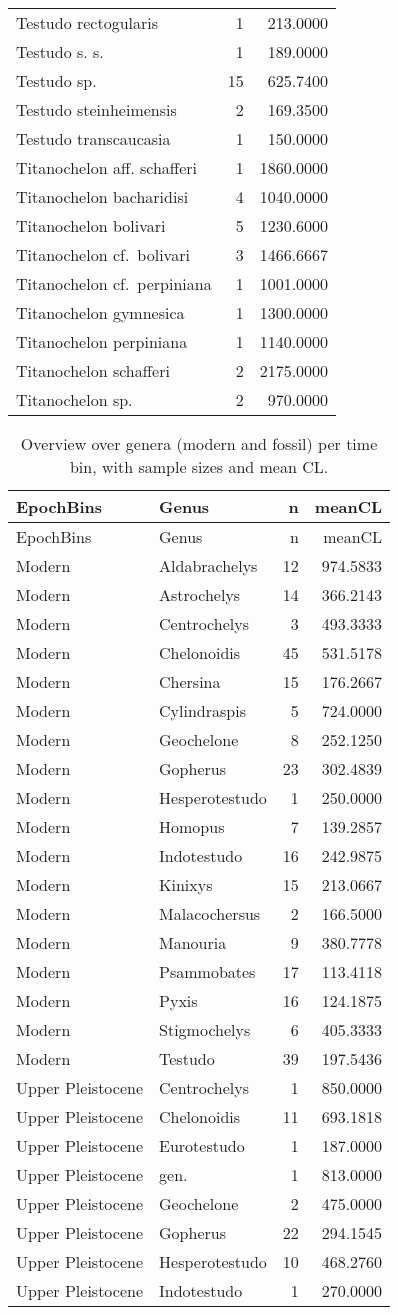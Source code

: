 \begin{longtable}[]{@{}lrr@{}}
	Testudo rectogularis & 1 & 213.0000\tabularnewline
	Testudo s. s. & 1 & 189.0000\tabularnewline
	Testudo sp. & 15 & 625.7400\tabularnewline
	Testudo steinheimensis & 2 & 169.3500\tabularnewline
	Testudo transcaucasia & 1 & 150.0000\tabularnewline
	Titanochelon aff. schafferi & 1 & 1860.0000\tabularnewline
	Titanochelon bacharidisi & 4 & 1040.0000\tabularnewline
	Titanochelon bolivari & 5 & 1230.6000\tabularnewline
	Titanochelon cf.~bolivari & 3 & 1466.6667\tabularnewline
	Titanochelon cf.~perpiniana & 1 & 1001.0000\tabularnewline
	Titanochelon gymnesica & 1 & 1300.0000\tabularnewline
	Titanochelon perpiniana & 1 & 1140.0000\tabularnewline
	Titanochelon schafferi & 2 & 2175.0000\tabularnewline
	Titanochelon sp. & 2 & 970.0000\tabularnewline
	\bottomrule
\end{longtable}

\begin{longtable}[]{@{}llrr@{}}
	\caption{Overview over genera (modern and fossil) per time bin, with
		sample sizes and mean CL.}
	\label{tab:GenBins}\tabularnewline
	\toprule
	EpochBins & Genus & n & meanCL\tabularnewline
	\midrule
	\endfirsthead
	\toprule
	EpochBins & Genus & n & meanCL\tabularnewline
	\midrule
	\endhead
	Modern & Aldabrachelys & 12 & 974.5833\tabularnewline
	Modern & Astrochelys & 14 & 366.2143\tabularnewline
	Modern & Centrochelys & 3 & 493.3333\tabularnewline
	Modern & Chelonoidis & 45 & 531.5178\tabularnewline
	Modern & Chersina & 15 & 176.2667\tabularnewline
	Modern & Cylindraspis & 5 & 724.0000\tabularnewline
	Modern & Geochelone & 8 & 252.1250\tabularnewline
	Modern & Gopherus & 23 & 302.4839\tabularnewline
	Modern & Hesperotestudo & 1 & 250.0000\tabularnewline
	Modern & Homopus & 7 & 139.2857\tabularnewline
	Modern & Indotestudo & 16 & 242.9875\tabularnewline
	Modern & Kinixys & 15 & 213.0667\tabularnewline
	Modern & Malacochersus & 2 & 166.5000\tabularnewline
	Modern & Manouria & 9 & 380.7778\tabularnewline
	Modern & Psammobates & 17 & 113.4118\tabularnewline
	Modern & Pyxis & 16 & 124.1875\tabularnewline
	Modern & Stigmochelys & 6 & 405.3333\tabularnewline
	Modern & Testudo & 39 & 197.5436\tabularnewline
	Upper Pleistocene & Centrochelys & 1 & 850.0000\tabularnewline
	Upper Pleistocene & Chelonoidis & 11 & 693.1818\tabularnewline
	Upper Pleistocene & Eurotestudo & 1 & 187.0000\tabularnewline
	Upper Pleistocene & gen. & 1 & 813.0000\tabularnewline
	Upper Pleistocene & Geochelone & 2 & 475.0000\tabularnewline
	Upper Pleistocene & Gopherus & 22 & 294.1545\tabularnewline
	Upper Pleistocene & Hesperotestudo & 10 & 468.2760\tabularnewline
	Upper Pleistocene & Indotestudo & 1 & 270.0000\tabularnewline

\end{longtable}
